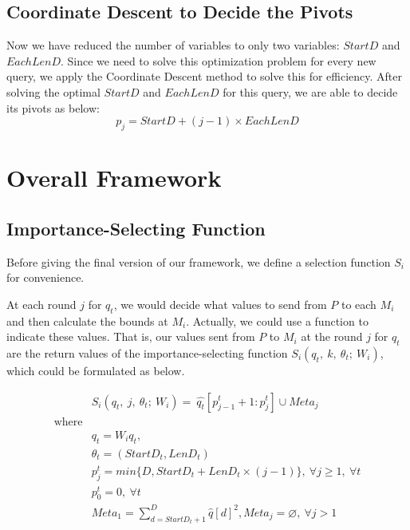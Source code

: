 
\subsection{Coordinate Descent to Decide the Pivots} %
\label{ss:coordinate_descent_to_decide_the_pivots}

Now we have reduced the number of variables to only two variables: $StartD$ and $EachLenD$. Since we need to solve this optimization problem for every new query, we apply the Coordinate Descent method to solve this for efficiency.  After solving the optimal $StartD$ and $EachLenD$ for this query, we are able to decide its pivots as below:
\begin{equation}
	p_j = StartD + (j-1)\times EachLenD	
\end{equation}



\section{Overall Framework} %
\label{s:overall_framework}
\subsection{Importance-Selecting Function} %
\label{ss:importance_selecting_function}

Before giving the final version of our framework, we define a selection function $S_i$ for convenience.  

At each round $j$ for $q_t$, we would decide what values to send from $P$ to each $M_i$ and then calculate the bounds at $M_i$. Actually, we could use a function to indicate these values.  That is, our values sent from $P$ to $M_i$ at the round $j$ for $q_t$ are the return values of the importance-selecting function $S_i(q_t,~k,~\theta_t;~W_i)$, which could be formulated as below.

\begin{equation}
\begin{aligned}
& S_i(q_t,~j,~\theta_t;~W_i) =~\hat{q_t}[p^t_{j-1}+1:p^t_j]\cup Meta_j \\
\text{where} \\
& \hat{q_t} = W_iq_t, \\
& \theta_t = (StartD_t, LenD_t) \\
& p^t_j = min\{ D, StartD_t + LenD_t\times (j-1) \},~\forall j\geq 1,~\forall t \\
& p^t_0 = 0,~\forall t\\
& Meta_1 = \sum^D_{d=StartD_t+1}{\hat{q}[d]^2}, Meta_j=\varnothing,~\forall j>1
\end{aligned}
\end{equation}

